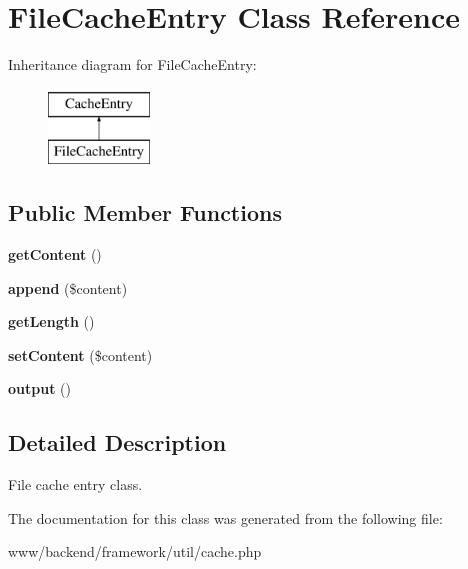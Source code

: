 \hypertarget{classFileCacheEntry}{
\section{FileCacheEntry Class Reference}
\label{classFileCacheEntry}
}
Inheritance diagram for FileCacheEntry:\begin{figure}[H]
\begin{center}
\leavevmode
\includegraphics[height=2.000000cm]{classFileCacheEntry}
\end{center}
\end{figure}
\subsection*{Public Member Functions}
\begin{DoxyCompactItemize}
\item 
\hypertarget{classFileCacheEntry_a143f518374598ddff649d8fb96fc6ccc}{
{\bfseries getContent} ()}
\label{classFileCacheEntry_a143f518374598ddff649d8fb96fc6ccc}

\item 
\hypertarget{classFileCacheEntry_a776f925ee61fb766ba9ba8582a518ea6}{
{\bfseries append} (\$content)}
\label{classFileCacheEntry_a776f925ee61fb766ba9ba8582a518ea6}

\item 
\hypertarget{classFileCacheEntry_a507128cf5ab3058304897646a311176b}{
{\bfseries getLength} ()}
\label{classFileCacheEntry_a507128cf5ab3058304897646a311176b}

\item 
\hypertarget{classFileCacheEntry_ae63e9a84d697e8e3f6af0f866a7fff18}{
{\bfseries setContent} (\$content)}
\label{classFileCacheEntry_ae63e9a84d697e8e3f6af0f866a7fff18}

\item 
\hypertarget{classFileCacheEntry_acfce6a2d1a2a8e47560d711e6fe5931c}{
{\bfseries output} ()}
\label{classFileCacheEntry_acfce6a2d1a2a8e47560d711e6fe5931c}

\end{DoxyCompactItemize}


\subsection{Detailed Description}
File cache entry class. 

The documentation for this class was generated from the following file:\begin{DoxyCompactItemize}
\item 
www/backend/framework/util/cache.php\end{DoxyCompactItemize}
